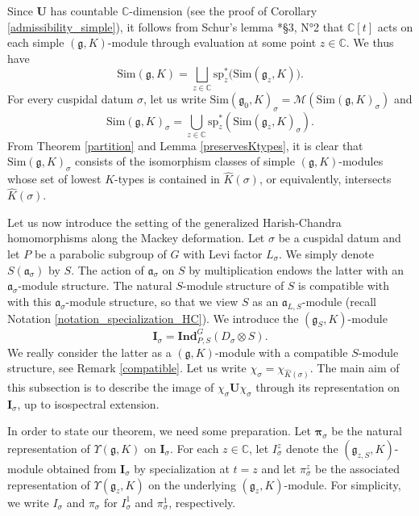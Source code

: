 \documentclass{amsart}
\theoremstyle{definition}
\begin{document}
Since $\bm{U}$ has countable $\mathbb{C}$-dimension (see the proof of Corollary \ref{admissibility_simple}), it follows from Schur's lemma \cite{Bourbaki}*{§3, N°2} that $\mathbb{C}[t]$ acts on each simple $(\bm{\mathfrak{g}},K)$-module through evaluation at some point $z \in \mathbb{C}$. We thus have
\begin{equation}\label{fibers_Sim}\mathrm{Sim}(\bm{\mathfrak{g}},K) = \bigsqcup_{z \in \mathbb{C}} \mathrm{sp}_z^*\big( \mathrm{Sim}(\bm{\mathfrak{g}}_z,K)\big).\end{equation}
For every cuspidal datum $\sigma$, let us write $\mathrm{Sim}(\mathfrak{g}_0,K)_\sigma  = \mathcal{M}(\mathrm{Sim}(\mathfrak{g},K)_\sigma)$ and
\begin{equation}\label{notation_sim_sigma}\mathrm{Sim}(\bm{\mathfrak{g}},K)_\sigma = \bigcup_{z \in \mathbb{C}} \mathrm{sp}_z^*(\mathrm{Sim}(\bm{\mathfrak{g}}_z,K)_\sigma).\end{equation}
From Theorem \ref{partition} and Lemma \ref{preservesKtypes}, it is clear that $\mathrm{Sim}(\bm{\mathfrak{g}},K)_\sigma$ consists of the isomorphism classes of simple $(\bm{\mathfrak{g}},K)$-modules whose set of lowest $K$-types is contained in $\widehat{K}(\sigma)$, or equivalently, intersects $\widehat{K}(\sigma)$.

Let us now introduce the setting of the generalized Harish-Chandra homomorphisms along the Mackey deformation. Let $\sigma$ be a cuspidal datum and let $P$ be a parabolic subgroup of $G$ with Levi factor $L_\sigma$. We simply denote $S(\mathfrak{a}_\sigma)$ by $S$. The action of $\mathfrak{a}_\sigma$ on $S$ by multiplication endows the latter with an $\mathfrak{a}_\sigma$-module structure. The natural $S$-module structure of $S$ is compatible with with this $\mathfrak{a}_\sigma$-module structure, so that we view $S$ as an $\mathfrak{a}_{L,S}$-module (recall Notation \ref{notation_specialization_HC}). We introduce the $(\bm{\mathfrak{g}}_S,K)$-module
\[\bm{I}_\sigma = \mathbf{Ind}_{P,S}^G(D_\sigma \otimes S).\]
We really consider the latter as a $(\bm{\mathfrak{g}},K)$-module with a compatible $S$-module structure, see Remark \ref{compatible}. Let us write $\chi_\sigma = \chi_{\widehat{K}(\sigma)}$. The main aim of this subsection is to describe the image of $\chi_{\sigma}\bm{U}\chi_\sigma$ through its representation on $\bm{I}_\sigma$, up to isospectral extension.



In order to state our theorem, we need some preparation. Let $\bm{\pi}_\sigma$ be the natural representation of $\Upsilon(\bm{\mathfrak{g}},K)$ on $\bm{I}_\sigma$. For each $z \in \mathbb{C}$, let $I_\sigma^z$ denote the $(\bm{\mathfrak{g}}_{z,S},K)$-module obtained from $\bm{I}_\sigma$ by specialization at $t = z$ and let $\pi_\sigma^z$ be the associated representation of $\Upsilon(\bm{\mathfrak{g}}_z,K)$ on the underlying $(\bm{\mathfrak{g}}_{z},K)$-module. For simplicity, we write $I_\sigma$ and $\pi_\sigma$ for $I_\sigma^1$ and $\pi_\sigma^1$, respectively.
\end{document}
